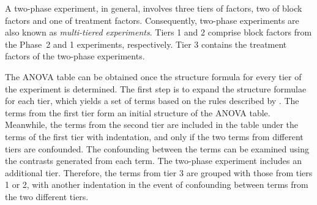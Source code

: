\documentclass[11pt,a4paper]{article}
\begin{document}
A two-phase experiment, in general, involves three tiers of factors, two of block factors and one of treatment factors. Consequently, two-phase experiments are also known as \emph{multi-tiered experiments}. Tiers 1 and 2 comprise block factors from the Phase~2 and 1 experiments, respectively. Tier 3 contains the treatment factors of the two-phase experiments. 

The ANOVA table can be obtained once the structure formula for every tier of the experiment is determined. The first step is to expand the structure formulae for each tier, which yields a set of terms based on the rules described by \cite{Wilkinson1973}. The terms from the first tier form an initial structure of the ANOVA table. Meanwhile, the terms from the second tier are included in the table under the terms of the first tier with indentation, and only if the two terms from different tiers are confounded. The confounding between the terms can be examined using the contrasts generated from each term. The two-phase experiment includes an additional tier. Therefore, the terms from tier 3 are grouped with those from tiers 1 or 2, with another indentation in the event of confounding between terms from the two different tiers. 
\end{document}
